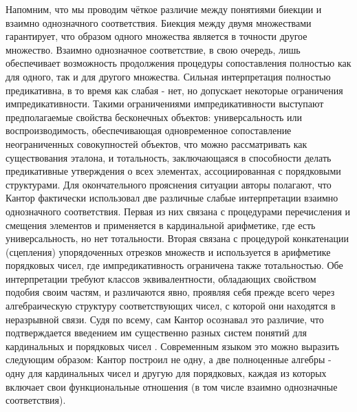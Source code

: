 \documentclass[12pt]{article}
\begin{document}
Напомним, что мы проводим чёткое различие между понятиями биекции и взаимно однозначного соответствия. Биекция между двумя множествами гарантирует, что образом одного множества является в точности другое множество. Взаимно однозначное соответствие, в свою очередь, лишь обеспечивает возможность продолжения процедуры сопоставления полностью как для одного, так и для другого множества. Сильная интерпретация полностью предикативна, в то время как слабая - нет, но допускает некоторые ограничения импредикативности. Такими ограничениями импредикативности выступают предполагаемые свойства бесконечных объектов: универсальность или воспроизводимость, обеспечивающая одновременное сопоставление неограниченных совокупностей объектов, что можно рассматривать как существования эталона, и тотальность, заключающаяся в способности делать предикативные утверждения о всех элементах, ассоциированная с порядковыми структурами. Для окончательного прояснения ситуации авторы полагают, что Кантор фактически использовал две различные слабые интерпретации взаимно однозначного соответствия. Первая из них связана с процедурами перечисления и смещения элементов и применяется в кардинальной арифметике, где есть универсальность, но нет тотальности. Вторая связана с процедурой конкатенации (сцепления) упорядоченных отрезков множеств и используется в арифметике порядковых чисел, где импредикативность ограничена также тотальностью. Обе интерпретации требуют классов эквивалентности, обладающих свойством подобия своим частям, и различаются явно, проявляя себя прежде всего через алгебраическую структуру соответствующих чисел, с которой они находятся в неразрывной связи. Судя по всему, сам Кантор осознавал это различие, что подтверждается введением им существенно разных систем понятий для кардинальных и порядковых чисел \cite{cantor-definitions}. Современным языком это можно выразить следующим образом: Кантор построил не одну, а две полноценные алгебры - одну для кардинальных чисел и другую для порядковых, каждая из которых включает свои функциональные отношения (в том числе взаимно однозначные соответствия). 
\end{document}
